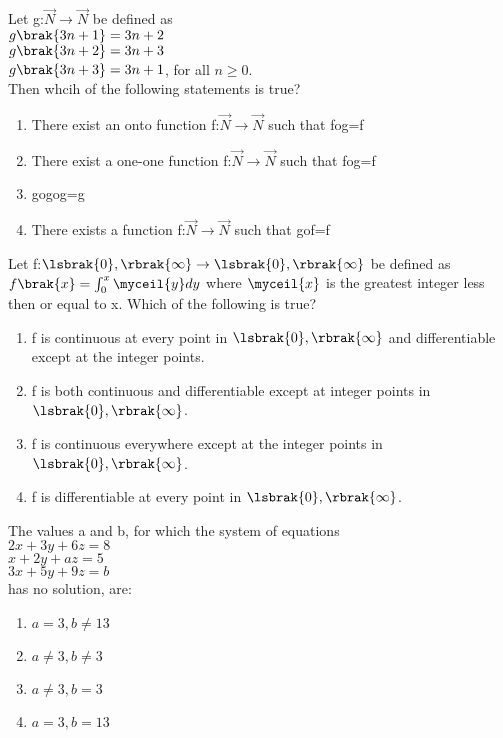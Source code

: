 \item Let g:$\vec{N} \to \vec{N}$ be defined as \\
$g\brak{3n+1}=3n+2$\\
$g\brak{3n+2}=3n+3$\\
$g\brak{3n+3}=3n+1$, for all $n\geq0$.\\
Then whcih of the following statements is true? \hfill{}
\begin{enumerate}
    \item There exist an onto function f:$\vec{N} \to \vec{N}$ such that fog=f
    \item There exist a one-one function f:$\vec{N}\to \vec{N}$ such that fog=f
    \item gogog=g
    \item There exists a function f:$\vec{N} \to \vec{N}$ such that gof=f
\end{enumerate}
\item Let f:$\lsbrak{0},\rbrak{\infty}\to \lsbrak{0},\rbrak{\infty}$ be defined as $f\brak{x}=\int_0^x \myceil{y}dy$ where $\myceil{x}$ is the greatest integer less then or equal to x. Which of the following is true? \hfill{}
\begin{enumerate}
    \item f is continuous at every point in $\lsbrak{0},\rbrak{\infty}$ and differentiable except at the integer points.
    \item f is both continuous and differentiable except at integer points in $\lsbrak{0},\rbrak{\infty}$.
    \item f is continuous everywhere except at the integer points in $\lsbrak{0},\rbrak{\infty}$.
    \item f is differentiable at every point in $\lsbrak{0},\rbrak{\infty}$.
\end{enumerate}
\item The values a and b, for which the system of equations\\ 
$2x+3y+6z=8$\\
$x+2y+az=5$\\
$3x+5y+9z=b$\\
has no solution, are: \hfill{}
\begin{enumerate}
    \item $a=3,b\neq13$
    \item $a\neq3,b\neq3$
    \item $a\neq3,b=3$
    \item $a=3,b=13$
\end{enumerate}
